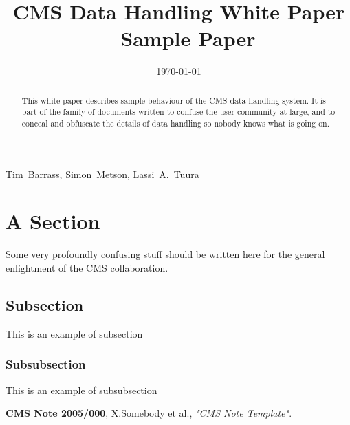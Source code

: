 \documentclass{cmspaper}
\begin{document}
\begin{titlepage}
  \date{\today} %
  \title{CMS Data Handling White Paper -- Sample Paper}

  \begin{Authlist}
    Tim~Barrass, Simon~Metson,
    Lassi~A.~Tuura
  \end{Authlist}


  \begin{abstract}
    This white paper describes sample behaviour of the CMS data handling
    system.  It is part of the family of documents written to confuse the
    user community at large, and to conceal and obfuscate the details of
    data handling so nobody knows what is going on.
  \end{abstract} 

\end{titlepage}

\setcounter{page}{2}

\section{A Section}
Some very profoundly confusing stuff should be written here for the general
enlightment of the CMS collaboration.

\subsection{Subsection}
This is an example of subsection

\subsubsection{Subsubsection}
This is an example of subsubsection

\begin{thebibliography}{9}
   {\bf CMS Note 2005/000},
    X.Somebody et al.,
    {\em "CMS Note Template"}.
\end{thebibliography}
 
\end{document}
